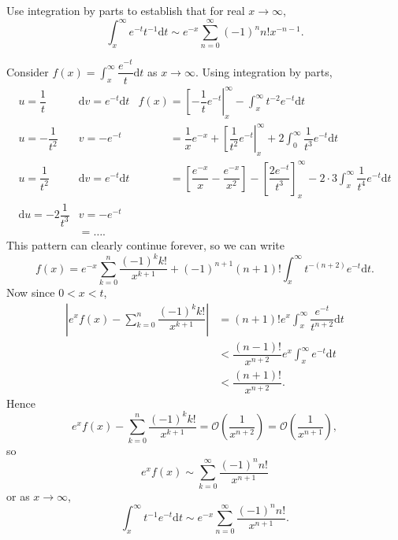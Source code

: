 \begin{problem}\label{problem5chapter3}
Use integration by parts to establish that for real $x \rightarrow \infty$,
$$\displaystyle\int_x^{\infty} e^{-t}t^{-1} \mathrm{d}t \sim e^{-x} \displaystyle\sum_{n=0}^{\infty} (-1)^n n! x^{-n-1}.$$
\end{problem}
\begin{solution}
Consider $f(x) = \displaystyle\int_x^{\infty} \dfrac{e^{-t}}{t} \mathrm{d}t$ as $x \rightarrow \infty$.
Using integration by parts,
$$\begin{array}{ll|ll}
u=\dfrac{1}{t} & \mathrm{d}v=e^{-t}\mathrm{d}t & f(x) = \left[ -\dfrac{1}{t}e^{-t} \right|_x^{\infty} - \displaystyle\int_x^{\infty} t^{-2} e^{-t}\mathrm{d}t \\
u=-\dfrac{1}{t^2} & v = -e^{-t} & \phantom{f(x)}= \dfrac{1}{x} e^{-x} + \left[ \dfrac{1}{t^2}e^{-t} \right|_x^{\infty} + 2 \displaystyle\int_0^{\infty} \dfrac{1}{t^3}e^{-t}\mathrm{d}t \\
u=\dfrac{1}{t^2} & \mathrm{d}v = e^{-t} \mathrm{d}t & \phantom{f(x)}=\!\left[ \dfrac{e^{-x}}{x} - \dfrac{e^{-x}}{x^2} \right]\!-\!\left[\dfrac{2e^{-t}}{t^3} \right]_x^{\infty}\!-\!\!2 \cdot 3\!\displaystyle\int_x^{\infty}\!\dfrac{1}{t^4}e^{-t}\mathrm{d}t \\
\mathrm{d}u = -2\dfrac{1}{t^3} & v = -e^{-t} \\
&= \ldots .
\end{array}$$
This pattern can clearly continue forever, so we can write
$$f(x) = e^{-x} \displaystyle\sum_{k=0}^n \dfrac{(-1)^k k!}{x^{k+1}} + (-1)^{n+1}(n+1)! \displaystyle\int_x^{\infty} t^{-(n+2)}e^{-t} \mathrm{d}t.$$
Now since $0 < x < t$,
$$\begin{array}{ll}
\left| e^x f(x) - \displaystyle\sum_{k=0}^n \dfrac{(-1)^k k!}{x^{k+1}} \right| &= (n+1)! e^x \displaystyle\int_x^{\infty} \dfrac{e^{-t}}{t^{n+2}} \mathrm{d}t \\
&< \dfrac{(n-1)!}{x^{n+2}} e^x \displaystyle\int_x^{\infty} e^{-t} \mathrm{d}t \\
&< \dfrac{(n+1)!}{x^{n+2}}.
\end{array}$$
Hence
$$e^x f(x) - \displaystyle\sum_{k=0}^n \dfrac{(-1)^k k!}{x^{k+1}} = \mathcal{O} \left( \dfrac{1}{x^{n+2}} \right) = \mathcal{O} \left( \dfrac{1}{x^{n+1}} \right),$$
so
$$e^x f(x) \sim \displaystyle\sum_{k=0}^{\infty} \dfrac{(-1)^n n!}{x^{n+1}}$$
or as $x \rightarrow \infty$,
$$\displaystyle\int_x^{\infty} t^{-1}e^{-t} \mathrm{d}t \sim e^{-x} \displaystyle\sum_{n=0}^{\infty} \dfrac{(-1)^n n!}{x^{n+1}}.$$
\end{solution}
